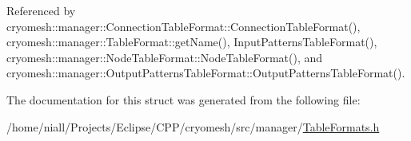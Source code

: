 \-Referenced by cryomesh\-::manager\-::\-Connection\-Table\-Format\-::\-Connection\-Table\-Format(), cryomesh\-::manager\-::\-Table\-Format\-::get\-Name(), \-Input\-Patterns\-Table\-Format(), cryomesh\-::manager\-::\-Node\-Table\-Format\-::\-Node\-Table\-Format(), and cryomesh\-::manager\-::\-Output\-Patterns\-Table\-Format\-::\-Output\-Patterns\-Table\-Format().



\-The documentation for this struct was generated from the following file\-:\begin{DoxyCompactItemize}
\item 
/home/niall/\-Projects/\-Eclipse/\-C\-P\-P/cryomesh/src/manager/\hyperlink{TableFormats_8h}{\-Table\-Formats.\-h}\end{DoxyCompactItemize}
